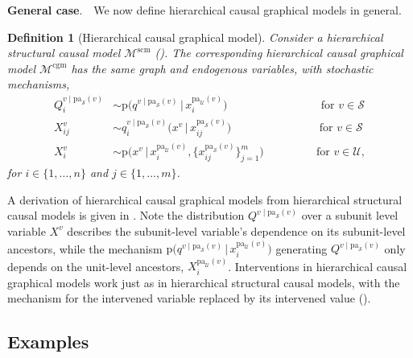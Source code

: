 \documentclass[12pt]{article}
\newtheorem{definition}{Definition}
\newcommand{\pa}{\mathrm{pa}}
\newcommand{\pr}{\mathrm{p}}
\newcommand{\cgm}{\mathrm{cgm}}
\newcommand{\scm}{\mathrm{scm}}
\newcommand{\parhead}[1]{\vspace{0.1in} \noindent \textbf{#1}. \,\,}
\begin{document}
\parhead{General case} We now define hierarchical causal graphical models in general.
\begin{definition}[Hierarchical causal graphical model] \label{def:hcgm}
Consider a hierarchical structural causal model $\mathcal{M}^{\scm}$ (). The corresponding hierarchical causal graphical model $\mathcal{M}^{\cgm}$ has the same graph and endogenous variables, with stochastic mechanisms,
\begin{equation} \label{eqn:hcgm}
\begin{split}
        Q^{v\mid \pa_\mathcal{S}(v)}_i &\sim \pr\big(q^{v\mid \pa_\mathcal{S}(v)} \, \big| \, x^{\pa_\mathcal{U}(v)}_{i}\big) \,\,\,\,\,\,\,\,\,\,\,\,\,\,\,\,\,\,\,\,\,\,\,\,\,\,\,\,\,\,\,\,\,\,\,\,\,\,\,\,\,\,\,\,\,\,\,\, \text{ for } v \in \mathcal{S}\\
        X^{v}_{i j} &\sim q^{v\mid \pa_\mathcal{S}(v)}_i\big(x^{v} \,\big|\, x^{\pa_\mathcal{S}(v)}_{i j} \big) \,\,\,\,\,\,\,\,\,\,\,\,\,\,\,\,\,\,\,\,\,\,\,\,\,\,\,\,\,\,\,\,\,\,\,\,\,\,\,\,\,\,\,\,\, \text{ for } v \in \mathcal{S}\\
X^{v}_i &\sim \pr\big(x^{v} \, \big| \, x^{\pa_\mathcal{U}(v)}_{i}, \{x^{\pa_\mathcal{S}(v)}_{i j} \big\}_{j=1}^m\big) \,\,\,\,\,\,\,\,\,\,\,\,\,\,\,\,\,\,\,\,\,\,\,\,\,\,\text{ for } v \in \mathcal{U},
\end{split}
\end{equation}
for $i \in \{1, \ldots, n\}$ and $j \in \{1, \ldots, m\}$.
\end{definition}
\noindent A derivation of hierarchical causal graphical models from hierarchical structural causal models is given in .
Note the distribution $Q^{v \mid \pa_\mathcal{S}(v)}$ over a subunit level variable $X^{v}$ describes the subunit-level variable's dependence on its subunit-level ancestors, while the mechanism $\pr\big(q^{v\mid \pa_\mathcal{S}(v)} \, \big| \, x^{\pa_\mathcal{U}(v)}_{i}\big)$ generating $Q^{v \mid \pa_\mathcal{S}(v)}$ only depends on the unit-level ancestors, $X^{\pa_\mathcal{U}(v)}_{i}$.
Interventions in hierarchical causal graphical models work just as in hierarchical structural causal models, with the mechanism for the intervened variable replaced by its intervened value ().


\subsection{Examples} \label{sec:hcgm_examples}
\end{document}
